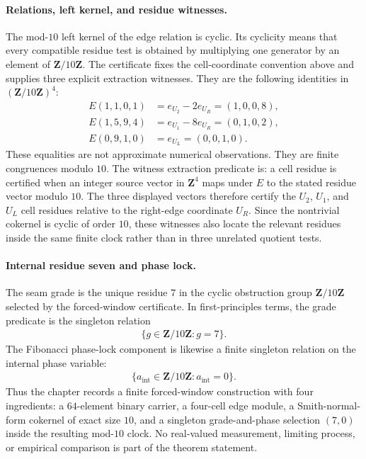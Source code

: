 \paragraph{Relations, left kernel, and residue witnesses.}
The mod-$10$ left kernel of the edge relation is cyclic. Its cyclicity means that every compatible residue test is obtained by multiplying one generator by an element of $\mathbf{Z}/10\mathbf{Z}$. The certificate fixes the cell-coordinate convention above and supplies three explicit extraction witnesses. They are the following identities in $\left(\mathbf{Z}/10\mathbf{Z}\right)^4$:
$$
\begin{aligned}
E(1,1,0,1) &= e_{U_2}-2e_{U_R}=(1,0,0,8),\\
E(1,5,9,4) &= e_{U_1}-8e_{U_R}=(0,1,0,2),\\
E(0,9,1,0) &= e_{U_L}=(0,0,1,0).
\end{aligned}
$$
These equalities are not approximate numerical observations. They are finite congruences modulo $10$. The witness extraction predicate is: a cell residue is certified when an integer source vector in $\mathbf{Z}^4$ maps under $E$ to the stated residue vector modulo $10$. The three displayed vectors therefore certify the $U_2$, $U_1$, and $U_L$ cell residues relative to the right-edge coordinate $U_R$. Since the nontrivial cokernel is cyclic of order $10$, these witnesses also locate the relevant residues inside the same finite clock rather than in three unrelated quotient tests.

\paragraph{Internal residue seven and phase lock.}
The seam grade is the unique residue $7$ in the cyclic obstruction group $\mathbf{Z}/10\mathbf{Z}$ selected by the forced-window certificate. In first-principles terms, the grade predicate is the singleton relation
$$
\begin{aligned}
\{g\in\mathbf{Z}/10\mathbf{Z}: g=7\}.
\end{aligned}
$$
The Fibonacci phase-lock component is likewise a finite singleton relation on the internal phase variable:
$$
\begin{aligned}
\{a_{\mathrm{int}}\in\mathbf{Z}/10\mathbf{Z}: a_{\mathrm{int}}=0\}.
\end{aligned}
$$
Thus the chapter records a finite forced-window construction with four ingredients: a $64$-element binary carrier, a four-cell edge module, a Smith-normal-form cokernel of exact size $10$, and a singleton grade-and-phase selection $(7,0)$ inside the resulting mod-$10$ clock. No real-valued measurement, limiting process, or empirical comparison is part of the theorem statement.

